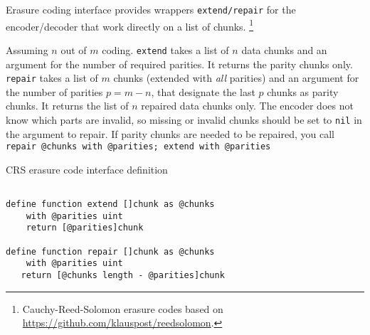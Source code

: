
Erasure coding interface provides wrappers \lstinline{extend/repair} for the encoder/decoder that work directly on a list of chunks.%
%
\footnote{Cauchy-Reed-Solomon erasure codes based on \url{https://github.com/klauspost/reedsolomon}.
}

Assuming $n$ out of $m$ coding.
\lstinline{extend} takes a list of $n$ data chunks and an argument for the number of required parities. It returns the parity chunks only.
\lstinline{repair} takes a list of $m$ chunks (extended with \emph{all} parities) and an argument for the number of parities $p=m-n$, that designate the last $p$ chunks as parity chunks. It returns the list of $n$ repaired data chunks only.
The encoder does not know which parts are invalid, so missing or invalid chunks should be set to \lstinline{nil} in the argument to repair.
If parity chunks are needed to be repaired, you call \lstinline{repair @chunks with @parities; extend with @parities}

\begin{definition}{CRS erasure code interface definition}\label{def:crs}
\begin{lstlisting}[language=buzz1]

define function extend []chunk as @chunks
    with @parities uint
    return [@parities]chunk

define function repair []chunk as @chunks  
    with @parities uint
   return [@chunks length - @parities]chunk

\end{lstlisting}
\end{definition}
